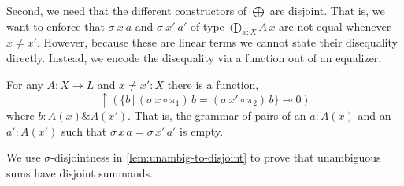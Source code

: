 \documentclass[acmsmall,nonacm]{acmart}
\newcommand{\lto}{\multimap}
\newcommand{\applto}[2]{#1 \, #2}
\newcommand{\LinSigTy}[3]{\textstyle\bigoplus_{#1 : #2} #3}
\newcommand{\equalizer}[3]{\{#1\,|\,\applto {#2}{#1} = \applto{#3}{#1} \}}
\begin{document}
Second, we need that the different constructors of
$\bigoplus$ are disjoint. That is, we want to enforce that $\sigma~x~a$ and
$\sigma~x'~a'$ of type $\LinSigTy{x}{X}{A\,x}$ are not equal whenever $x \neq x'$.
However, because these are linear terms we cannot state their disequality
directly. Instead, we encode the disequality via a function out of an equalizer,

\begin{axiom}
\label{ax:disjointness}
For any $A : X \to L$ and $x \neq x' : X$ there is a function,
\[
  \uparrow(\equalizer{b}{\left( \sigma\,x \circ \pi_1 \right)}{\left(  \sigma\,x'\circ \pi_2 \right)}
  \lto 0)
\]
  where $b: A(x) \& A(x')$. That is, the grammar of pairs of an
$a:A(x)$ and an $a': A(x')$ such that $\sigma\,x\,a = \sigma\,x'\,a'$
is empty.
\end{axiom}

We use $\sigma$-disjointness in \cref{lem:unambig-to-disjoint} to prove that
unambiguous sums have disjoint summands.
\end{document}
